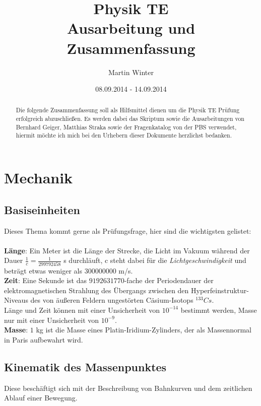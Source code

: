 \documentclass[12pt,a4paper,ngerman]{article}
\title{Physik TE \\
Ausarbeitung und Zusammenfassung}
\author{Martin Winter}
\date{08.09.2014 - 14.09.2014}
\begin{document}
  \maketitle
\begin{abstract}
Die folgende Zusammenfassung soll als Hilfsmittel dienen um die Physik TE Prüfung erfolgreich abzuschließen. 
Es werden dabei das Skriptum sowie die Ausarbeitungen von Bernhard Geiger, Matthias Straka sowie der Fragenkatalog von der PBS verwendet, hiermit möchte ich mich bei den Urhebern dieser Dokumente herzlichst bedanken. 
\end{abstract}
\pagebreak
  
\tableofcontents
  
\pagebreak
  
\renewcommand{\arraystretch}{1.5}
%
%

\section{Mechanik}
\subsection{Basiseinheiten}
Dieses Thema kommt gerne als Prüfungsfrage, hier sind die wichtigsten gelistet:
\\
\\
\textbf{Länge}: Ein Meter ist die Länge der Strecke, die Licht im Vakuum während der Dauer $\frac{1}{c} = \frac{1}{299792458} $ s durchläuft, c steht dabei für die \textit{Lichtgeschwindigkeit} und beträgt etwas weniger als $300000000$ m/s.
\vspace{0.5cm}\\
\textbf{Zeit}: Eine Sekunde ist das $9192631770$-fache der Periodendauer der elektromagnetischen Strahlung des Übergangs zwischen den Hyperfeinstruktur-Niveaus des von äußeren Feldern ungestörten Cäsium-Isotops $^{133}Cs$.
\\
Länge und Zeit können mit einer Unsicherheit von $10^{-14}$ bestimmt werden, Masse nur mit einer Unsicherheit von $10^{-9}$. 
\vspace{0.5cm}\\
\textbf{Masse}: $1$ kg ist die Masse eines Platin-Iridium-Zylinders, der als Massennormal in Paris aufbewahrt wird.

\subsection{Kinematik des Massenpunktes}
Diese beschäftigt sich mit der Beschreibung von Bahnkurven und dem zeitlichen Ablauf einer Bewegung. \\
\end{document}
